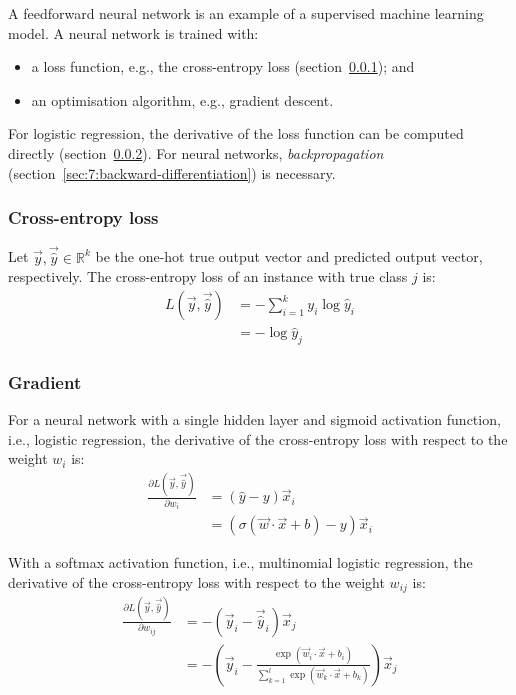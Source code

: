 A feedforward neural network is an example of a supervised machine learning
model.
A neural network is trained with:
\begin{itemize}
  \item a loss function, e.g., the cross-entropy loss
        (section~\ref{sec:7:cross-entropy-loss}); and
  \item an optimisation algorithm, e.g., gradient descent.
\end{itemize}
For logistic regression, the derivative of the loss function can be computed
directly (section~\ref{sec:7:gradient}).
For neural networks, \textit{backpropagation}
(section~\ref{sec:7:backward-differentiation}) is necessary.

\subsubsection{Cross-entropy loss}
\label{sec:7:cross-entropy-loss}

\begin{dfn}
  Let $\vec{y}, \vec{\hat{y}} \in \mathbb{R}^k$ be the one-hot true output
  vector and predicted output vector, respectively.
  The cross-entropy loss of an instance with true class $j$ is:
  \begin{align}
    L(\vec{y}, \vec{\hat{y}})
     & = -\sum_{i = 1}^{k} y_i \log \hat{y}_i
    \\
     & = -\log \hat{y}_j
  \end{align}
\end{dfn}

\subsubsection{Gradient}
\label{sec:7:gradient}

For a neural network with a single hidden layer and sigmoid activation function,
i.e., logistic regression, the derivative of the cross-entropy loss with respect
to the weight $w_i$ is:
\begin{align*}
  \frac{\partial L(\vec{y}, \vec{\hat{y}})}{\partial w_i}
   & = (\hat{y} - y) \vec{x}_i
  \\
   & = (\sigma(\vec{w} \cdot \vec{x} + b) - y) \vec{x}_i
\end{align*}

With a softmax activation function, i.e., multinomial logistic regression, the
derivative of the cross-entropy loss with respect to the weight $w_{ij}$ is:
\begin{align*}
  \frac{\partial L(\vec{y}, \vec{\hat{y}})}{\partial w_{ij}}
   & = - (\vec{y}_i - \vec{\hat{y}}_i) \vec{x}_j
  \\
   & = - \left(
  \vec{y}_i -
  \frac{ \exp(\vec{w}_i \cdot \vec{x} + b_i)}{\sum_{k = 1}^{l} \exp(\vec{w}_k \cdot \vec{x} + b_k)}
  \right) \vec{x}_j
\end{align*}

